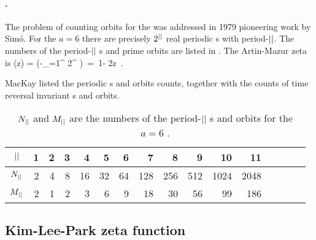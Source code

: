 \paragraph{\Henlatt.}
The problem of counting orbits for the
{\HenonMap} was addressed in 1979 pioneering work by
Sim{\'o}.
For the ${a}=6$ {\HenonMap} there are precisely $2^{||}$ 
real periodic {\lattstate}s with period-${||}$. The numbers 
of the period-${||}$ {\lattstate}s and prime orbits
are listed in .
The Artin-Mazur zeta is
\bea
\zetatop(z)
 =  \exp \left(-\sum_{\cl{}=1}^\infty
{} 2^\cl{} 
         \right)
\,=\,
1- 2z
\,.
\label{HenonZeta}
\eea

MacKay %
listed the periodic {\lattstate}s and orbits counts, together with
the counts of time reversal invariant {\lattstate}s and orbits.



\begin{table}
\begin{tabular}{c|rrrrr|rrrrr|rrrrr}
${||}$ &  1 &  2 &  3 &  4 &  5 &
       6 &  7 &  8 &  9 & 10 &
      11 & \\%
\hline
$N_{||}$ &  2 &  4 &  8 & 16 &  32 &
       64 &  128 &  256 & 512 & 1024 &
      2048 & %
             \rule[-1ex]{0ex}{3.5ex} \\
$M_{||}$ &   2 &   1 &   2 &  3 &  6 &
         9 & 18 &  30 & 56  & 99 &
       186 &  %
\end{tabular}
\bigskip
\caption{\label{tab:LC21HamHenon}
$N_{||}$ and $M_{||}$ are the numbers of 
the period-${||}$ {\lattstate}s and 
orbits for the ${a}=6$ {\HenonMap}.
}
\end{table}
%

\subsection{Kim-Lee-Park zeta function}
\label{sect:KiLePa}

